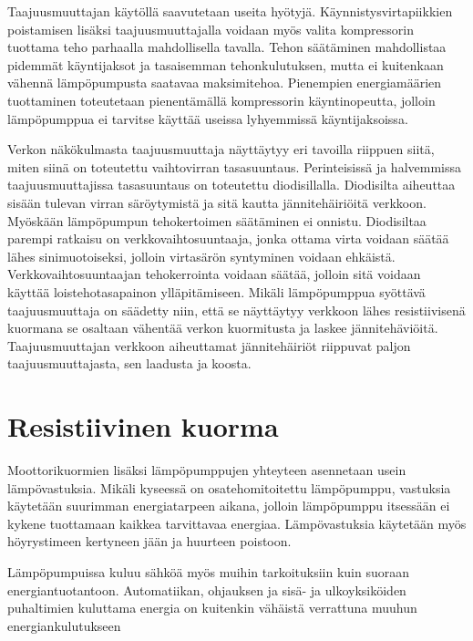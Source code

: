   Taajuusmuuttajan käytöllä saavutetaan useita hyötyjä. Käynnistysvirtapiikkien poistamisen lisäksi taajuusmuuttajalla voidaan myös valita kompressorin tuottama teho parhaalla mahdollisella tavalla. Tehon säätäminen mahdollistaa pidemmät käyntijaksot ja tasaisemman tehonkulutuksen, mutta ei kuitenkaan vähennä lämpöpumpusta saatavaa maksimitehoa. Pienempien energiamäärien tuottaminen toteutetaan pienentämällä kompressorin käyntinopeutta, jolloin lämpöpumppua ei tarvitse käyttää useissa lyhyemmissä käyntijaksoissa.

  Verkon näkökulmasta taajuusmuuttaja näyttäytyy eri tavoilla riippuen siitä, miten siinä on toteutettu vaihtovirran tasasuuntaus. Perinteisissä ja halvemmissa taajuusmuuttajissa tasasuuntaus on toteutettu diodisillalla. Diodisilta aiheuttaa sisään tulevan virran säröytymistä ja sitä kautta jännitehäiriöitä verkkoon. Myöskään lämpöpumpun tehokertoimen säätäminen ei onnistu. Diodisiltaa parempi ratkaisu on verkkovaihtosuuntaaja, jonka ottama virta voidaan säätää lähes sinimuotoiseksi, jolloin virtasärön syntyminen voidaan ehkäistä. Verkkovaihtosuuntaajan tehokerrointa voidaan säätää, jolloin sitä voidaan käyttää loistehotasapainon ylläpitämiseen. Mikäli lämpöpumppua syöttävä taajuusmuuttaja on säädetty niin, että se näyttäytyy verkkoon lähes resistiivisenä kuormana se osaltaan vähentää verkon kuormitusta ja laskee jännitehäviöitä. Taajuusmuuttajan verkkoon aiheuttamat jännitehäiriöt riippuvat paljon taajuusmuuttajasta, sen laadusta ja koosta. \parencite{koskenjoki}

\section{Resistiivinen kuorma}
  Moottorikuormien lisäksi lämpöpumppujen yhteyteen asennetaan usein lämpövastuksia. Mikäli kyseessä on osatehomitoitettu lämpöpumppu, vastuksia käytetään suurimman energiatarpeen aikana, jolloin lämpöpumppu itsessään ei kykene tuottamaan kaikkea tarvittavaa energiaa. Lämpövastuksia käytetään myös höyrystimeen kertyneen jään ja huurteen poistoon.

  Lämpöpumpuissa kuluu sähköä myös muihin tarkoituksiin kuin suoraan energiantuotantoon. Automatiikan, ohjauksen ja sisä- ja ulkoyksiköiden puhaltimien kuluttama energia on kuitenkin vähäistä verrattuna muuhun energiankulutukseen
